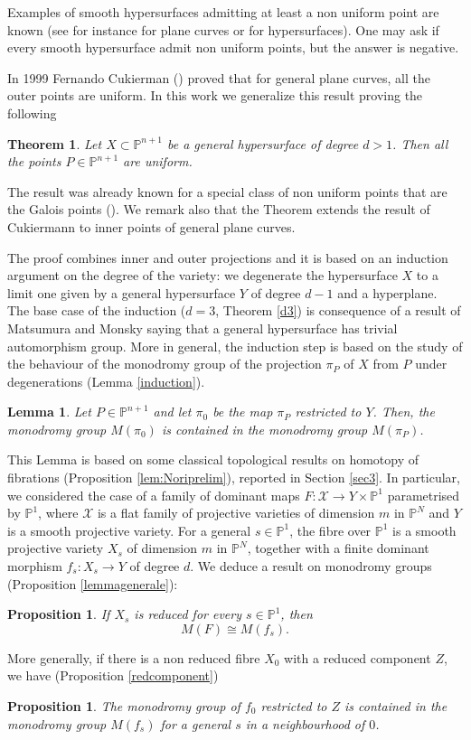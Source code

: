 \documentclass[12pt,a4paper,twoside,leqno,noamsfonts]{amsart}
\newtheorem{lem}[cor]{Lemma}
\newtheorem{thm}[cor]{Theorem}
\newtheorem{prop}[cor]{Proposition}
\theoremstyle{definition}
\newcommand{\bP}{\mathbb{P}}
\newcommand{\cX}{\mathcal{X}}
\begin{document}
Examples of smooth hypersurfaces admitting at least a non uniform point are known (see for instance \cite{Miura1} \cite{MY1} for plane curves or \cite{Yoshiara} for hypersurfaces). 
One may ask if every smooth hypersurface admit non uniform points, but the answer is negative. 

In 1999 Fernando Cukierman (\cite{Cuk}) proved that for general plane curves, all the outer points are uniform. In this work we generalize this result proving the following 
\begin{thm}
Let $X \subset \bP^{n+1}$ be a general hypersurface of degree $d>1$. Then all the points $P \in \bP^{n+1}$ are uniform.
\end{thm}
The result was already known for a special class of non uniform points that are the Galois points (\cite[Theorem 1]{Yoshiara}). We remark also that the Theorem extends the result of Cukiermann to inner points of general plane curves. 

The proof combines inner and outer projections and it is based on an induction argument on the degree of the variety: we degenerate the hypersurface $X$ to a limit one given by a general hypersurface $Y$ of degree $d-1$ and a hyperplane. 
The base case of the induction ($d=3$, Theorem \ref{d3}) is consequence of a result of Matsumura and Monsky \cite{MM} saying that a general hypersurface has trivial automorphism group. More in general, the induction step is based on the study of the behaviour of the monodromy group of the projection $\pi_P$ of $X$ from $P$ under degenerations (Lemma \ref{induction}). 
\begin{lem}
Let $P \in \bP^{n+1}$ and let $\pi_0$ be the map $\pi_P$ restricted to $Y$. Then, the monodromy group $M(\pi_0)$ is contained in the monodromy group $M(\pi_P)$.
\end{lem}
This Lemma is based on some classical topological results on homotopy of fibrations (Proposition \ref{lem:Noriprelim}), reported in Section \ref{sec3}. In particular, we considered the case of a family of dominant maps $F: \cX \to Y \times \bP^1$ parametrised by $\bP^1$, where $\cX$ is a flat family of projective varieties of dimension $m$ in $\bP^N$ and $Y$ is a smooth projective variety. For a general $s \in \bP^1$, the fibre over $\bP^1$ is a smooth projective variety $X_s$ of dimension $m$ in $\bP^N$, together with a finite dominant morphism $f_s: X_s \to Y$ of degree $d$. We deduce a result on monodromy groups (Proposition \ref{lemmagenerale}):
\begin{prop}
If $X_s$ is reduced for every $s \in \bP^1$, then  $$M(F)\cong M(f_s).$$
\end{prop}
More generally, if there is a non reduced fibre $X_0$ with a reduced component $Z$, we have (Proposition \ref{redcomponent})
\begin{prop}
The monodromy group of $f_0$ restricted to $Z$ is contained in the monodromy group $M(f_s)$ for a general $s$ in a neighbourhood of $0$. 
\end{prop}
\end{document}
